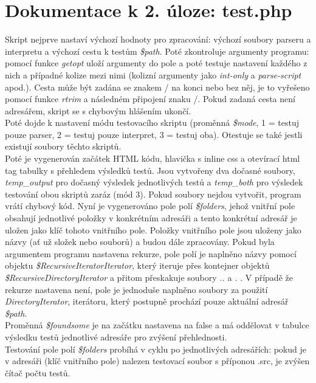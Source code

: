 \documentclass[10pt]{article}
\begin{document}
\section*{Dokumentace k 2. úloze: test.php}
Skript nejprve nastaví výchozí hodnoty pro zpracování: výchozí soubory parseru a interpretu a výchozí cestu k testům \textit{\$path}. Poté zkontroluje argumenty programu: pomocí funkce \textit{getopt} uloží argumenty do pole a poté testuje nastavení každého z nich a případné kolize mezi nimi (kolizní argumenty jako \textit{int-only} a \textit{parse-script} apod.). Cesta může být zadána se znakem / na konci nebo bez něj, je to vyřešeno pomocí funkce \textit{rtrim} a následném připojení znaku /. Pokud zadaná cesta není adresářem, skript se s chybovým hlášením ukončí.\\
Poté dojde k nastavení módu testovacího skriptu (proměnná \textit{\$mode}, 1 = testuj pouze parser, 2 = testuj pouze interpret, 3 = testuj oba). Otestuje se také jestli existují soubory těchto skriptů.\\
Poté je vygenerován začátek HTML kódu, hlavička s inline css a otevírací html tag tabulky s přehledem výsledků testů. Jsou vytvořeny dva dočasné soubory, \textit{temp\_output} pro dočasný výsledek jednotlivých testů a \textit{temp\_both} pro výsledek testování obou skriptů zaráz (mód 3). Pokud soubory nejdou vytvořit, program vrátí chybový kód. Nyní je vygenerováno pole polí \textit{\$folders}, jehož vnitřní pole obsahují jednotlivé položky v konkrétním adresáři a tento konkrétní adresář je uložen jako klíč tohoto vnitřního pole. Položky vnitřního pole jsou uloženy jako názvy (ať už složek nebo souborů) a budou dále zpracovány. Pokud byla argumentem programu nastavena rekurze, pole polí je naplněno názvy pomocí objektu \textit{\$RecursiveIteratorIterator}, který iteruje přes kontejner objektů \textit{\$RecursiveDirectoryIterator} a přitom přeskakuje soubory \textit{..} a \textit{.} . V případě že rekurze nastavena není, pole je jednoduše naplněno soubory za použití \textit{DirectoryIterator}, iterátoru, který postupně prochází pouze aktuální adresář \textit{\$path}.\\
Proměnná \textit{\$foundsome} je na začátku nastavena na false a má oddělovat v tabulce výsledku testů jednotlivé adresáře pro zvýšení přehlednosti.\\
Testování pole polí \textit{\$folders} probíhá v cyklu po jednotlivých adresářích: pokud je v adresáři (klíč vnitřního pole) nalezen testovací soubor s příponou .src, je zvýšen čítač počtu testů.\\
\end{document}
